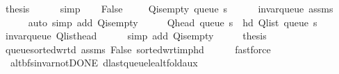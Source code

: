 \begin{isabellebody}
\ {\isacharquery}{\kern0pt}thesis\isanewline
\ \ \ \ \isamarkupfalse%
\ simp\isanewline
{}\isamarkupfalse%
\isanewline
\ \ \isamarkupfalse%
\ False\isanewline
\ \ \isamarkupfalse%
\ {\isachardoublequoteopen}{\isasymnot}\ Q{\isacharunderscore}{\kern0pt}is{\isacharunderscore}{\kern0pt}empty\ {\isacharparenleft}{\kern0pt}queue\ s{\isacharparenright}{\kern0pt}{\isachardoublequoteclose}\isanewline
\ \ \ \ \isamarkupfalse%
\ invar{\isacharunderscore}{\kern0pt}queue\ assms\isanewline
\ \ \ \ \isamarkupfalse%
\ {\isacharparenleft}{\kern0pt}auto\ simp\ add{\isacharcolon}{\kern0pt}\ Q{\isachardot}{\kern0pt}is{\isacharunderscore}{\kern0pt}empty{\isacharparenright}{\kern0pt}\isanewline
\ \ \isamarkupfalse%
\ \isamarkupfalse%
\ {\isachardoublequoteopen}Q{\isacharunderscore}{\kern0pt}head\ {\isacharparenleft}{\kern0pt}queue\ s{\isacharparenright}{\kern0pt}\ {\isacharequal}{\kern0pt}\ hd\ {\isacharparenleft}{\kern0pt}Q{\isacharunderscore}{\kern0pt}list\ {\isacharparenleft}{\kern0pt}queue\ s{\isacharparenright}{\kern0pt}{\isacharparenright}{\kern0pt}{\isachardoublequoteclose}\isanewline
\ \ \ \ \isamarkupfalse%
\ invar{\isacharunderscore}{\kern0pt}queue\ Q{\isachardot}{\kern0pt}list{\isacharunderscore}{\kern0pt}head\isanewline
\ \ \ \ \isamarkupfalse%
\ {\isacharparenleft}{\kern0pt}simp\ add{\isacharcolon}{\kern0pt}\ Q{\isachardot}{\kern0pt}is{\isacharunderscore}{\kern0pt}empty{\isacharparenright}{\kern0pt}\isanewline
\ \ \isamarkupfalse%
\ \isamarkupfalse%
\ {\isacharquery}{\kern0pt}thesis\isanewline
\ \ \ \ \isamarkupfalse%
\ queue{\isacharunderscore}{\kern0pt}sorted{\isacharunderscore}{\kern0pt}wrt{\isacharunderscore}{\kern0pt}d\ assms\ False\ sorted{\isacharunderscore}{\kern0pt}wrt{\isacharunderscore}{\kern0pt}imp{\isacharunderscore}{\kern0pt}hd\isanewline
\ \ \ \ \isamarkupfalse%
\ fastforce\isanewline
{}\isamarkupfalse%
%
\endisatagproof
{\isafoldproof}%
%
\isadelimproof
\isanewline
%
\endisadelimproof
%
\isadeliminvisible
\isanewline
%
\endisadeliminvisible
%
\isataginvisible
{}\isamarkupfalse%
\ {\isacharparenleft}{\kern0pt}\ alt{\isacharunderscore}{\kern0pt}bfs{\isacharunderscore}{\kern0pt}invar{\isacharunderscore}{\kern0pt}not{\isacharunderscore}{\kern0pt}DONE{\isacharparenright}{\kern0pt}\ d{\isacharunderscore}{\kern0pt}last{\isacharunderscore}{\kern0pt}queue{\isacharunderscore}{\kern0pt}le{\isacharunderscore}{\kern0pt}alt{\isacharunderscore}{\kern0pt}fold{\isacharunderscore}{\kern0pt}aux{\isacharunderscore}{\kern0pt}{}{\isacharcolon}{\kern0pt}\isanewline

\end{isabellebody}
